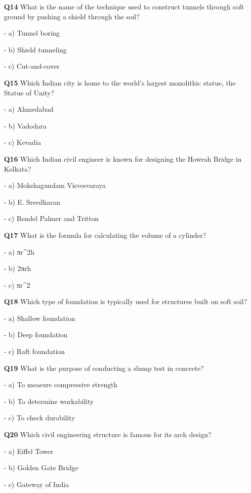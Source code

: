 \textbf{Q14} What is the name of the technique used to construct tunnels through soft ground by pushing a shield through the soil?\par
\quad - a) Tunnel boring\par
\quad - b) Shield tunneling\par
\quad - c) Cut-and-cover\par

\textbf{Q15} Which Indian city is home to the world's largest monolithic statue, the Statue of Unity?\par
\quad - a) Ahmedabad\par
\quad - b) Vadodara\par
\quad - c) Kevadia\par

\textbf{Q16} Which Indian civil engineer is known for designing the Howrah Bridge in Kolkata?\par
\quad - a) Mokshagundam Visvesvaraya\par
\quad - b) E. Sreedharan\par
\quad - c) Rendel Palmer and Tritton\par

\textbf{Q17} What is the formula for calculating the volume of a cylinder?\par
\quad - a) πr^2h\par
\quad - b) 2πrh\par
\quad - c) πr^2\par

\textbf{Q18} Which type of foundation is typically used for structures built on soft soil?\par
\quad - a) Shallow foundation\par
\quad - b) Deep foundation\par
\quad - c) Raft foundation\par

\textbf{Q19} What is the purpose of conducting a slump test in concrete?\par
\quad - a) To measure compressive strength\par
\quad - b) To determine workability\par
\quad - c) To check durability\par

\textbf{Q20} Which civil engineering structure is famous for its arch design?\par
\quad - a) Eiffel Tower\par
\quad - b) Golden Gate Bridge\par
\quad - c) Gateway of India\par

